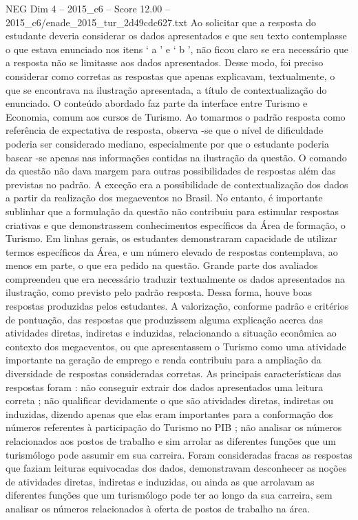 \begin{textsample}{NEG Dim 4 – 2015\_c6 – Score 12.00 – 2015\_c6/enade\_2015\_tur\_2d49cdc627.txt}
Ao solicitar que a resposta do estudante deveria considerar os dados apresentados e que seu texto contemplasse o que estava enunciado nos itens ‘ a ’ e ‘ b ’, não ficou claro se era necessário que a resposta não se limitasse aos dados apresentados.
Desse modo, foi preciso considerar como corretas as respostas que apenas explicavam, textualmente, o que se encontrava na ilustração apresentada, a título de contextualização do enunciado.
O conteúdo abordado faz parte da interface entre Turismo e Economia, comum aos cursos de Turismo.
Ao tomarmos o padrão resposta como referência de expectativa de resposta, observa -se que o nível de dificuldade poderia ser considerado mediano, especialmente por que o estudante poderia basear -se apenas nas informações contidas na ilustração da questão.
O comando da questão não dava margem para outras possibilidades de respostas além das previstas no padrão.
A exceção era a possibilidade de contextualização dos dados a partir da realização dos megaeventos no Brasil.
No entanto, é importante sublinhar que a formulação da questão não contribuiu para estimular respostas criativas e que demonstrassem conhecimentos específicos da Área de formação, o Turismo.
Em linhas gerais, os estudantes demonstraram capacidade de utilizar termos específicos da Área, e um número elevado de respostas contemplava, ao menos em parte, o que era pedido na questão.
Grande parte dos avaliados compreendeu que era necessário traduzir textualmente os dados apresentados na ilustração, como previsto pelo padrão resposta.
Dessa forma, houve boas respostas produzidas pelos estudantes.
A valorização, conforme padrão e critérios de pontuação, das respostas que produzissem alguma explicação acerca das atividades diretas, indiretas e induzidas, relacionando a situação econômica ao contexto dos megaeventos, ou que apresentassem o Turismo como uma atividade importante na geração de emprego e renda contribuiu para a ampliação da diversidade de respostas consideradas corretas.
As principais características das respostas foram : não conseguir extrair dos dados apresentados uma leitura correta ; não qualificar devidamente o que são atividades diretas, indiretas ou induzidas, dizendo apenas que elas eram importantes para a conformação dos números referentes à participação do Turismo no PIB ; não analisar os números relacionados aos postos de trabalho e sim arrolar as diferentes funções que um turismólogo pode assumir em sua carreira.
Foram consideradas fracas as respostas que faziam leituras equivocadas dos dados, demonstravam desconhecer as noções de atividades diretas, indiretas e induzidas, ou ainda as que arrolavam as diferentes funções que um turismólogo pode ter ao longo da sua carreira, sem analisar os números relacionados à oferta de postos de trabalho na área.

\end{textsample}
